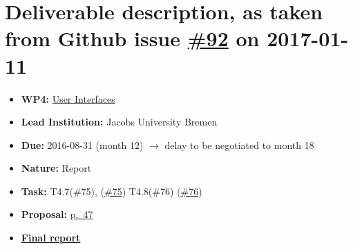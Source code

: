 \section*{\texorpdfstring{Deliverable description, as taken from Github
issue
\href{https://github.com/OpenDreamKit/OpenDreamKit/issues/91}{\#92} on
2017-01-11}{Deliverable description, as taken from Github issue \#92 on 2017-01-11}}\label{deliverable-description-as-taken-from-github-issue-92-on-2017-01-11}

\begin{itemize}
\tightlist
\item
  \textbf{WP4:}
  \href{https://github.com/OpenDreamKit/OpenDreamKit/tree/master/WP4}{User
  Interfaces}
\item
  \textbf{Lead Institution:} Jacobs University Bremen
\item
  \textbf{Due:} 2016-08-31 (month 12) $\rightarrow$ delay to be negotiated to month 18
\item
  \textbf{Nature:} Report
\item
  \textbf{Task:}  T4.7(\#75), 
  (\href{https://github.com/OpenDreamKit/OpenDreamKit/issues/75}{\#75})  
  T4.8(\#76)
  (\href{https://github.com/OpenDreamKit/OpenDreamKit/issues/76}{\#76}) 
\item
  \textbf{Proposal:}
  \href{https://github.com/OpenDreamKit/OpenDreamKit/raw/master/Proposal/proposal-www.pdf}{p.~47}
\item
  \textbf{\href{https://github.com/OpenDreamKit/OpenDreamKit/raw/master/WP4/D4.3/report-final.pdf}{Final
  report}}
\end{itemize}


